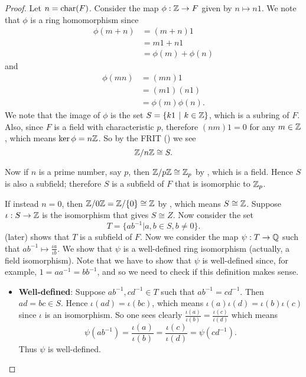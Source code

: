 \begin{proof}
    Let $n = \mathrm{char}(F)$. Consider the map $\phi: \mathbb{Z} \to F$ given by $n \mapsto n1$. We note that $\phi$ is a ring homomorphism since
    \begin{align*}
        \phi(m + n) &= (m + n)1\\
        &= m1 + n1\\
        &= \phi(m) + \phi(n)
    \end{align*}
    and
    \begin{align*}
        \phi(mn) &= (mn)1\\
        &= (m1)(n1)\\
        &= \phi(m)\phi(n).
    \end{align*}
    We note that the image of $\phi$ is the set $S = \{k1 \vert k \in \Z\}$, which is a subring of $F$. Also, since $F$ is a field with characteristic $p$, therefore $(nm)1 = 0$ for any $m \in \mathbb{Z}$, which means $\ker\phi = n\mathbb{Z}$. So by the FRIT () we see
    \[
        \mathbb{Z}/n\mathbb{Z} \cong S.
    \]
    
    Now if $n$ is a prime number, say $p$, then $\mathbb{Z}/p\mathbb{Z} \cong \mathbb{Z}_p$ by , which is a field. Hence $S$ is also a subfield; therefore $S$ is a subfield of $F$ that is isomorphic to $\mathbb{Z}_p$.

    If instead $n = 0$, then $\mathbb{Z}/0\mathbb{Z} = \mathbb{Z}/\{0\} \cong \mathbb{Z}$ by , which means $S \cong \mathbb{Z}$. Suppose $\iota: S \to \mathbb{Z}$ is the isomorphism that gives $S \cong Z$. Now consider the set
    \[
        T = \{ab^{-1} \vert a, b \in S, b \neq 0\}.
    \]
     (later) shows that $T$ is a subfield of $F$. Now we consider the map $\psi: T \to \mathbb{Q}$ such that $ab^{-1} \mapsto \frac{\iota{a}}{\iota{b}}$. We show that $\psi$ is a well-defined ring isomorphism (actually, a field isomorphism). Note that we have to show that $\psi$ is well-defined since, for example, $1 = aa^{-1} = bb^{-1}$, and so we need to check if this definition makes sense.
    \begin{itemize}
        \item \textbf{Well-defined}: Suppose $ab^{-1}, cd^{-1} \in T$ such that $ab^{-1} = cd^{-1}$. Then $ad = bc \in S$. Hence $\iota(ad) = \iota(bc)$, which means $\iota(a)\iota(d) = \iota(b)\iota(c)$ since $\iota$ is an isomorphism. So one sees clearly $\frac{\iota(a)}{\iota(b)} = \frac{\iota(c)}{\iota(d)}$ which means
        \[
            \psi(ab^{-1}) = \frac{\iota(a)}{\iota(b)} = \frac{\iota(c)}{\iota(d)} = \psi(cd^{-1}).
        \]
        Thus $\psi$ is well-defined.


\end{itemize}
\end{proof}
